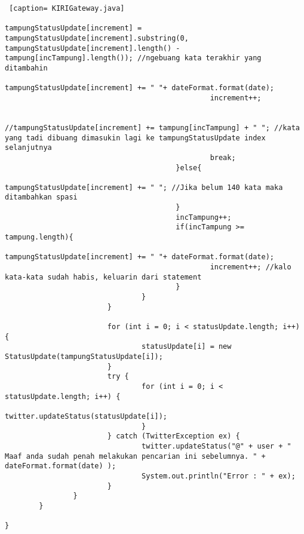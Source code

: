 \begin{lstlisting} [caption= KIRIGateway.java]
												tampungStatusUpdate[increment] = tampungStatusUpdate[increment].substring(0, tampungStatusUpdate[increment].length() - tampung[incTampung].length()); //ngebuang kata terakhir yang ditambahin
												tampungStatusUpdate[increment] += " "+ dateFormat.format(date);
												increment++;
												
												//tampungStatusUpdate[increment] += tampung[incTampung] + " "; //kata yang tadi dibuang dimasukin lagi ke tampungStatusUpdate index selanjutnya
												break;
										}else{
												tampungStatusUpdate[increment] += " "; //Jika belum 140 kata maka ditambahkan spasi
										}
										incTampung++;
										if(incTampung >= tampung.length){
												tampungStatusUpdate[increment] += " "+ dateFormat.format(date);
												increment++; //kalo kata-kata sudah habis, keluarin dari statement
										}
								}
						}
						
						for (int i = 0; i < statusUpdate.length; i++) {
								statusUpdate[i] = new StatusUpdate(tampungStatusUpdate[i]);
						}
						try {
								for (int i = 0; i < statusUpdate.length; i++) {
										twitter.updateStatus(statusUpdate[i]);
								}
						} catch (TwitterException ex) {
								twitter.updateStatus("@" + user + " Maaf anda sudah penah melakukan pencarian ini sebelumnya. " + dateFormat.format(date) );
								System.out.println("Error : " + ex);
						}
				}
		}
		
}
\end{lstlisting}